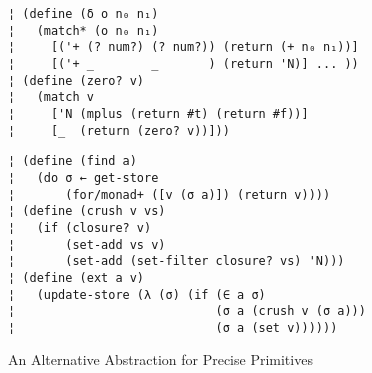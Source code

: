 \begin{figure} %
\begin{lstlisting}
¦ (define (δ o n₀ n₁)
¦   (match* (o n₀ n₁)
¦     [('+ (? num?) (? num?)) (return (+ n₀ n₁))]
¦     [('+ _        _       ) (return 'N)] ... ))
¦ (define (zero? v)
¦   (match v
¦     ['N (mplus (return #t) (return #f))]
¦     [_  (return (zero? v))]))
\end{lstlisting}
\figskip{}
\begin{lstlisting}
¦ (define (find a)
¦   (do σ ← get-store
¦       (for/monad+ ([v (σ a)]) (return v))))
¦ (define (crush v vs)
¦   (if (closure? v)
¦       (set-add vs v)
¦       (set-add (set-filter closure? vs) 'N)))
¦ (define (ext a v)
¦   (update-store (λ (σ) (if (∈ a σ)
¦                            (σ a (crush v (σ a)))
¦                            (σ a (set v))))))
\end{lstlisting}
\vspace{-0.75em}
\caption{An Alternative Abstraction for Precise Primitives}
\label{f:pres-delta}
\vspace{-1em}
\end{figure} %
